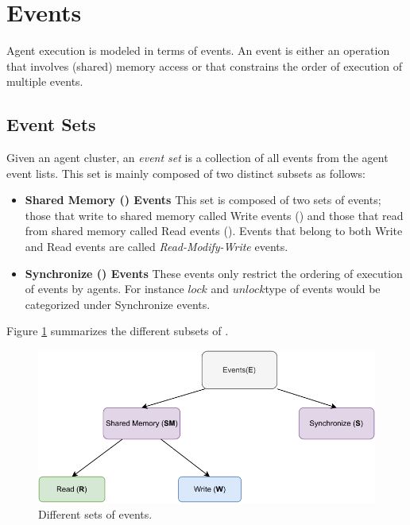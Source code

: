 \section{Events}
        
    Agent execution is modeled in terms of events. An event is either an operation that involves (shared) memory access or that constrains the order of execution of multiple events.

    \subsection{Event Sets}
        Given an agent cluster, an \textit{event set}  is a collection of all events from the agent event lists. 
        This set is mainly composed of two distinct subsets as follows: 
        \begin{itemize}
            \item \textbf{Shared Memory () Events}  
                This set is composed of two sets of events; those that write to shared memory called Write events () and those that read from shared memory called Read events (). Events that belong to both Write and Read events are called \textit{Read-Modify-Write} events. 
            
            \item \textbf{Synchronize () Events} 
                These events only restrict the ordering of execution of events by agents. For instance $lock$ and $unlock$\footnotemark type of events would be categorized under Synchronize events.
    
        \end{itemize}
        
        Figure \ref{model:event_sets} summarizes the different subsets of .
        \begin{figure}[H]
            \centering 
            \includegraphics[scale=0.7]{3.ECMAScriptMemoryModel/EventTypes.pdf}
            \caption{Different sets of events.}
            \label{model:event_sets}
        \end{figure}

